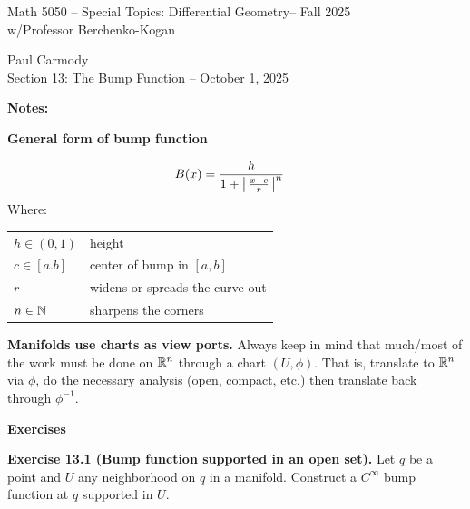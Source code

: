 \documentclass[12pt,a4paper]{report}
\newcommand{\CLASSNAME}{Math 5050 -- Special Topics: Differential Geometry}
\newcommand{\STUDENTNAME}{Paul Carmody}
\newcommand{\ASSIGNMENT}{Section 13: The Bump Function }
\newcommand{\DUEDATE}{October 1, 2025}
\newcommand{\PROFESSOR}{Professor Berchenko-Kogan}
\newcommand{\SEMESTER}{Fall 2025}
\begin{document}
\begin{center}
	\Large{\CLASSNAME -- \SEMESTER} \\
	\large{ w/\PROFESSOR}
\end{center}
\begin{center}
	\STUDENTNAME \\
	\ASSIGNMENT -- \DUEDATE\\
\end{center} 

\textbf{\Large{Notes:}}
\begin{description}
	\item \textbf{General form of bump function}
	
	\begin{align*}
		B(x) &= \frac{h}{1+\left |\, \frac{x-c}{r} \,\right |^n}
	\end{align*}Where:\\
	\begin{tabular}{l l}
		$h \in (0,1)$ & height \\
		$c \in [a.b]$ & center of bump in $[a,b]$ \\
		$r$ & widens or spreads the curve out \\
		$n \in \mathbb{N}$ & sharpens the corners
	\end{tabular}
	
	\item \textbf{Manifolds use charts as view ports.}  Always keep in mind that much/most of the work must be done on $\mathbb{R}^n$ through a chart $(U, \phi)$.  That is, translate to $\mathbb{R}^n$ via $\phi$, do the necessary analysis (open, compact, etc.) then translate back through $\phi^{-1}$.
	
	\item \textbf{Exercises}
	
	\textbf{Exercise 13.1 (Bump function supported in an open set).}  Let $q$ be a point and $U$ any neighborhood on $q$ in a manifold. Construct a $C^\infty$ bump function at $q$ supported in $U$.
	

\end{description}
\end{document}

